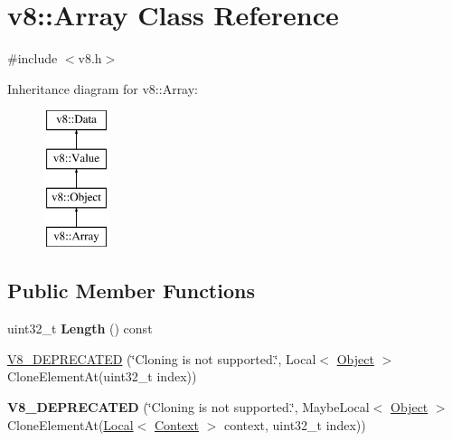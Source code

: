 \hypertarget{classv8_1_1Array}{}\section{v8\+:\+:Array Class Reference}
\label{classv8_1_1Array}


{\ttfamily \#include $<$v8.\+h$>$}

Inheritance diagram for v8\+:\+:Array\+:\begin{figure}[H]
\begin{center}
\leavevmode
\includegraphics[height=4.000000cm]{classv8_1_1Array}
\end{center}
\end{figure}
\subsection*{Public Member Functions}
\begin{DoxyCompactItemize}
\item 
uint32\+\_\+t {\bfseries Length} () const \hypertarget{classv8_1_1Array_a3c47dfd8d26e60ed4fcdc683034d6d9c}{}\label{classv8_1_1Array_a3c47dfd8d26e60ed4fcdc683034d6d9c}

\item 
\hyperlink{classv8_1_1Array_ae4d15fb9781bcd653e5eecffd4d0ffac}{V8\+\_\+\+D\+E\+P\+R\+E\+C\+A\+T\+ED} (\char`\"{}Cloning is not supported.\char`\"{}, Local$<$ \hyperlink{classv8_1_1Object}{Object} $>$ Clone\+Element\+At(uint32\+\_\+t index))
\item 
{\bfseries V8\+\_\+\+D\+E\+P\+R\+E\+C\+A\+T\+ED} (\char`\"{}Cloning is not supported.\char`\"{}, Maybe\+Local$<$ \hyperlink{classv8_1_1Object}{Object} $>$ Clone\+Element\+At(\hyperlink{classv8_1_1Local}{Local}$<$ \hyperlink{classv8_1_1Context}{Context} $>$ context,                                                                                                                                                                                               uint32\+\_\+t index))\hypertarget{classv8_1_1Array_ae30e4a34fc94cd4b52cd21d508b6e3b7}{}\label{classv8_1_1Array_ae30e4a34fc94cd4b52cd21d508b6e3b7}

\end{DoxyCompactItemize}

